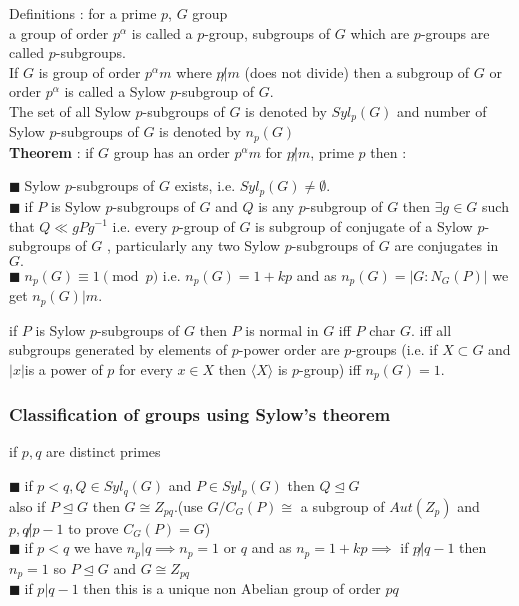 \documentclass[11pt]{extarticle}
\newcommand{\y}{$\blacksquare\;$}
\newcommand{\tbx}[2][]{
	\begin{tcolorbox}[enhanced,breakable,size=small,colback=black!2!white,title={#1},arc is angular, arc=1.5mm,drop fuzzy shadow]
		#2
	\end{tcolorbox}
}
\begin{document}
\begin{multicols}{2}
{		
	}
	\tbx[\textbf{SYLOW'S Theorem} ]{
		{ Definitions :  for a prime $ p $, $ G $ group\\
			a group of order $ p^\alpha $ is called a $p $-group, subgroups of $ G $ which are $ p $-groups are called 
			$ p $-subgroups.\\
			If $ G $ is group of order $ p^\alpha m $ where $ p \not| m $ (does not divide) then a subgroup of $ G $ or order $ p^\alpha $ is called a Sylow $ p $-subgroup of $ G. $\\
			The set of all Sylow $ p $-subgroups of $ G $ is denoted by $ Syl_p(G) $ and number of  Sylow $ p $-subgroups of $ G $ is denoted by $ n_p(G) $}\\
		\textbf{Theorem} : if $ G $ group has an order $ p^\alpha m $ for $ p\not| m $, prime $ p $ then :
		
			\y  Sylow $ p $-subgroups of $ G $ exists, i.e. $ Syl_p(G)\neq \emptyset $. \\
			\y  if $ P $ is Sylow $ p $-subgroups of $ G $ and $ Q $ is any $ p $-subgroup of $ G $ then $ \exists g \in G $ such that $ Q\ll gPg^{-1} $ i.e. every $ p $-group of $ G $ is subgroup of conjugate of  a Sylow $ p $-subgroups of $ G $ , particularly any two Sylow $ p $-subgroups of $ G $ are conjugates in $ G. $ \\
			\y  $ n_p(G)\equiv 1 \pmod{p} $ i.e. $ n_p(G)=1+kp $ and as $ n_p(G)=|G:N_G(P)| $ we get $ n_p(G) | m .$ }
		
	\tbx[Consequences of of Sylow's Theorem ]{
		if $ P $ is Sylow $ p $-subgroups of $ G $ then $P$ is normal in $ G $ iff $ P $ char $ G .$ iff all subgroups generated by 
		elements of $ p $-power order are $ p $-groups  (i.e. if $ X\subset G $ and $ |x| $is a power of $ p $ for every 
		$ x\in X $ then $ \langle X \rangle $ is $ p $-group) iff $ n_p(G)=1. $}
	\newcolumn
	\subsubsection{ Classification of groups using Sylow's theorem}
	 if $ p,q $ are distinct primes
	\tbx[group $ G $ of order $ pq $ ]{
		
			\y   if $ p<q , Q\in Syl_q(G)$ and $ P\in Syl_p(G) $  then $ Q\trianglelefteq G $ \\ 
			also if $ P\trianglelefteq G $ then $ G\cong Z_{pq}.$(use $ G/C_G(P) \cong $ a subgroup of $ Aut(Z_p) $ and $ p,q\not| p-1 $ to prove $ C_G(P)=G $)	\\
			\y  if $ p<q $ we have $ n_p|q  \implies n_p=1 $ or $ q $  and as $ n_p=1+kp \implies $ if $ p\not| q-1 $ then $ n_p=1 $ so $ P\trianglelefteq G $ and $ G \cong Z_{pq} $  \\
			\y  if $ p|q-1 $ then this is a unique non Abelian group of order $ pq $ }
		

\end{multicols}
\end{document}
